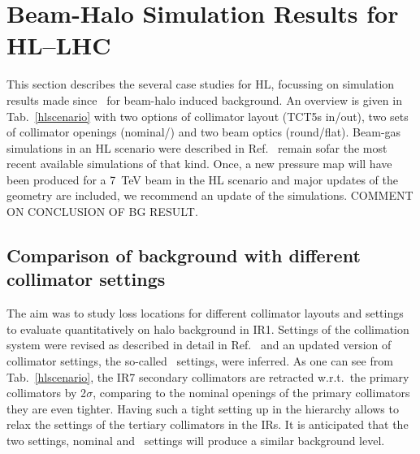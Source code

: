 \section{Beam-Halo Simulation Results for HL--LHC\label{hllhcResults}}


This section describes the several case studies for HL, focussing on simulation results made since~\cite{ipac2014_rkh} for beam-halo induced background. An overview is given in Tab.~\ref{hlscenario} with two options of collimator layout (TCT5s in/out), two sets of collimator openings (nominal/\twosigmaret) and two beam optics (round/flat). Beam-gas simulations in an HL scenario were described in Ref.~\cite{ipac2014_rkh} remain sofar the most recent available simulations of that kind. Once, a new pressure map will have been produced for a 7~TeV beam in the HL scenario and major updates of the geometry are included, we recommend an update of the simulations. COMMENT ON CONCLUSION OF BG RESULT.

\subsection{Comparison of background with different collimator settings}

The aim was to study loss locations for different collimator layouts and settings to evaluate quantitatively on halo background in IR1. Settings of the collimation system were revised as described in detail in Ref.~\cite{collSettRef} and an updated version of collimator settings, the so-called \twosigmaret~settings, were inferred. As one can see from Tab.~\ref{hlscenario}, the IR7 secondary collimators are retracted w.r.t.~the primary collimators by 2$\sigma$, comparing to the nominal openings of the primary collimators they are even tighter. Having such a tight setting up in the hierarchy allows to relax the settings of the tertiary collimators in the IRs. It is anticipated that the two settings, nominal and \twosigmaret~settings will produce a similar background level.  

